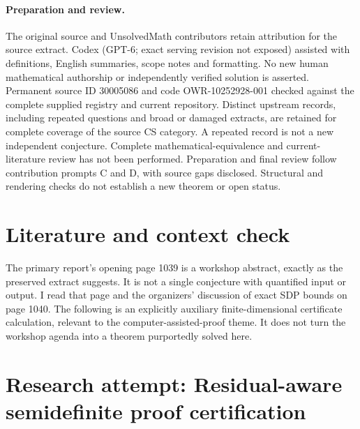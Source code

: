 \documentclass[11pt]{article}
\begin{document}
\paragraph{Preparation and review.}
The original source and UnsolvedMath contributors retain attribution for the source extract. Codex (GPT-6; exact serving revision not exposed) assisted with definitions, English summaries, scope notes and formatting. No new human mathematical authorship or independently verified solution is asserted. Permanent source ID 30005086 and code OWR-10252928-001 checked against the complete supplied registry and current repository. Distinct upstream records, including repeated questions and broad or damaged extracts, are retained for complete coverage of the source CS category. A repeated record is not a new independent conjecture. Complete mathematical-equivalence and current-literature review has not been performed. Preparation and final review follow contribution prompts C and D, with source gaps disclosed. Structural and rendering checks do not establish a new theorem or open status.
\label{end:30005086}

\section{Literature and context check}

The primary report's opening page 1039 is a workshop abstract, exactly as the
preserved extract suggests. It is not a single conjecture with quantified input
or output. I read that page and the organizers' discussion of exact SDP bounds
on page 1040. The following is an explicitly auxiliary finite-dimensional
certificate calculation, relevant to the computer-assisted-proof theme. It does
not turn the workshop agenda into a theorem purportedly solved here.

\section{Research attempt: Residual-aware semidefinite proof certification}
\end{document}

